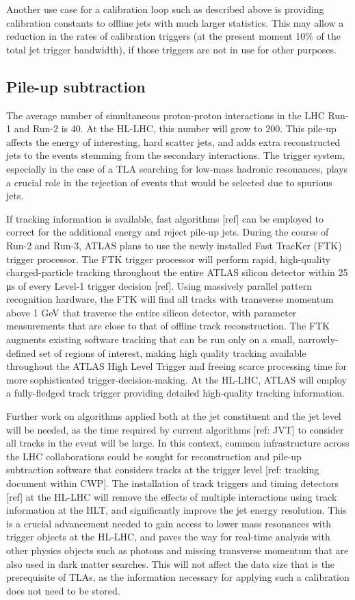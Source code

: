 \documentclass[a4paper,justified]{tufte-handout}
\begin{document}
Another use case for a calibration loop such as described above is providing calibration constants to offline jets with much larger statistics. This may allow a reduction in the rates of calibration triggers (at the present moment 10\% of the total jet trigger bandwidth), if those triggers are not in use for other purposes.

\subsection{Pile-up subtraction}

The average number of simultaneous proton-proton interactions in the LHC Run-1 and Run-2 is 40.  At the HL-LHC, this number will grow to 200. This pile-up affects the energy of interesting, hard scatter jets, and adds extra reconstructed jets to the events stemming from the secondary interactions. The trigger system, especially in the case of a TLA searching for low-mass hadronic resonances, plays a crucial role in the rejection of events that would be selected due to spurious jets. 

If tracking information is available, fast algorithms [ref] can be employed to correct for the additional energy and reject pile-up jets. During the course of  Run-2 and Run-3, ATLAS plans to use the newly installed Fast TracKer (FTK) trigger processor. The FTK  trigger processor will perform rapid, high-quality charged-particle tracking throughout the entire ATLAS silicon detector within 25 μs of every Level-1 trigger decision [ref].  Using massively parallel pattern recognition hardware, the FTK will find all tracks with transverse momentum above 1 GeV that traverse the entire silicon detector, with parameter measurements that are close to that of offline track reconstruction. The FTK augments existing software tracking that can be run only on a small, narrowly-defined set of regions of interest, making high quality tracking available throughout the ATLAS High Level Trigger and freeing scarce processing time for more sophisticated trigger-decision-making. At the HL-LHC, ATLAS will employ a fully-fledged track trigger providing detailed high-quality tracking information. 

Further work on algorithms applied both at the jet constituent and the jet level will be needed, as the time required by current algorithms [ref: JVT] to consider all tracks in the event will be large.  In this context, common infrastructure across the LHC collaborations could be sought for reconstruction and pile-up subtraction software that considers tracks at the trigger level [ref: tracking document within CWP]. 
The installation of track triggers and timing detectors [ref] at the HL-LHC will remove the effects of multiple interactions using track information at the HLT, and significantly improve the jet energy resolution. This is a crucial advancement needed to gain access to lower mass resonances with trigger objects at the HL-LHC, and paves the way for real-time analysis with other physics objects such as photons and missing transverse momentum that are also used in dark matter searches. This will not affect the data size that is the prerequisite of TLAs, as the information necessary for applying such a calibration does not need to be stored. 
\end{document}
